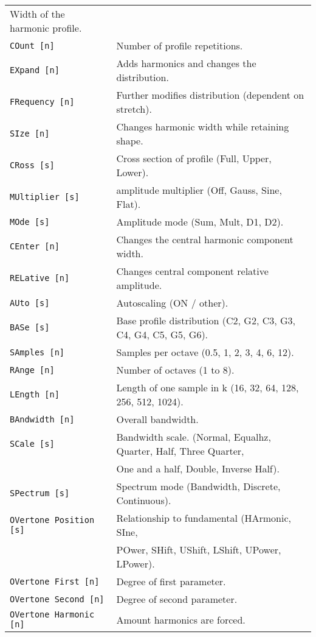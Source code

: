 \begin{table}[H]
\begin{tabular}{l l}
   Width of the harmonic profile. \\
\texttt{COunt [n]} &
   Number of profile repetitions. \\
\texttt{EXpand [n]} &
   Adds harmonics and changes the distribution. \\
\texttt{FRequency [n]} &
   Further modifies distribution (dependent on stretch). \\
\texttt{SIze [n]} &
   Changes harmonic width while retaining shape. \\
\texttt{CRoss [s]} &
   Cross section of profile (Full, Upper, Lower). \\
\texttt{MUltiplier [s]} &
   amplitude multiplier (Off, Gauss, Sine, Flat). \\
\texttt{MOde [s]} &
   Amplitude mode (Sum, Mult, D1, D2). \\
\texttt{CEnter [n]} &
   Changes the central harmonic component width. \\
\texttt{RELative [n]} &
   Changes central component relative amplitude. \\
\texttt{AUto [s]} &
   Autoscaling (ON / other). \\
\texttt{BASe [s]} &
   Base profile distribution (C2, G2, C3, G3, C4, G4, C5, G5, G6). \\
\texttt{SAmples [n]} &
   Samples per octave (0.5, 1, 2, 3, 4, 6, 12). \\
\texttt{RAnge [n]} &
   Number of octaves (1 to 8). \\
\texttt{LEngth [n]} &
   Length of one sample in k (16, 32, 64, 128, 256, 512, 1024). \\
\texttt{BAndwidth [n]} &
   Overall bandwidth. \\
\texttt{SCale [s]} &
   Bandwidth scale. (Normal, Equalhz, Quarter, Half, Three Quarter,\\
\texttt{} &
   One and a half, Double, Inverse Half).\\
\texttt{SPectrum [s]} &
   Spectrum mode (Bandwidth, Discrete, Continuous). \\
\texttt{OVertone Position [s]} &
   Relationship to fundamental (HArmonic, SIne,\\
\texttt{} &
   POwer, SHift, UShift, LShift, UPower, LPower).\\
\texttt{OVertone First [n]} &
   Degree of first parameter. \\
\texttt{OVertone Second [n]} &
   Degree of second parameter.   \\
\texttt{OVertone Harmonic [n]} &
   Amount harmonics are forced.  \\
      \end{tabular}
   \end{table}
